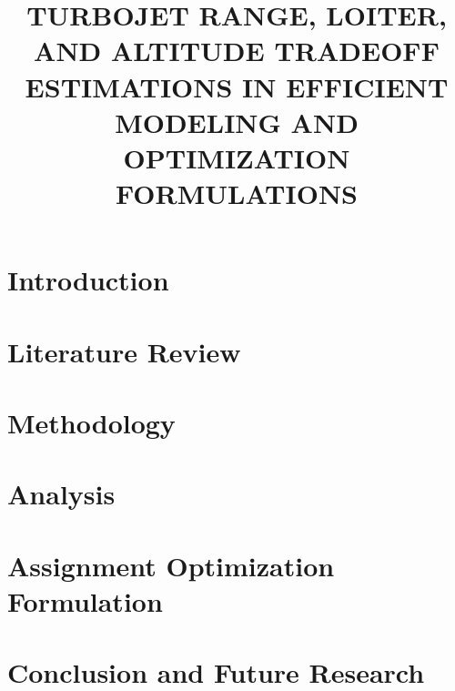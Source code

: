 \documentclass[12pt,letterpaper,oneside]{book}
\title{TURBOJET RANGE, LOITER, AND ALTITUDE TRADEOFF ESTIMATIONS IN EFFICIENT MODELING AND OPTIMIZATION FORMULATIONS}
\begin{document}
\frontmatter
	\flyleaf
    \disclaimerpage
    \titlepageAFIT
    \committeepage
    
    
    \tableofcontents
    \listoffigures
    \listoftables
\mainmatter
	\chapter{Introduction}
	
    \chapter{Literature Review}
    
    \chapter{Methodology}
    
    \chapter{Analysis}
    
    \chapter{Assignment Optimization Formulation}
    
    \chapter{Conclusion and Future Research}
    
    \appendix
    
\backmatter
	\singlespace
	
	 
	\clearpage

\end{document}
